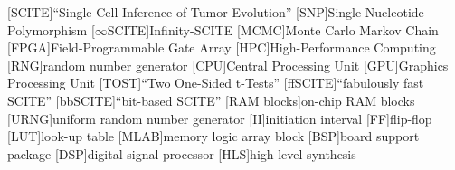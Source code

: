 [SCITE]{``Single Cell Inference of Tumor Evolution''}
[SNP]{Single-Nucleotide Polymorphism}
[$\infty$SCITE]{Infinity-SCITE}
[MCMC]{Monte Carlo Markov Chain}
[FPGA]{Field-Programmable Gate Array}
[HPC]{High-Performance Computing}
[RNG]{random number generator}
[CPU]{Central Processing Unit}
[GPU]{Graphics Processing Unit}
[TOST]{``Two One-Sided t-Tests''}
[ffSCITE]{``fabulously fast SCITE''}
[bbSCITE]{``bit-based SCITE''}
[RAM blocks]{on-chip RAM blocks}
[URNG]{uniform random number generator}
[II]{initiation interval}
[FF]{flip-flop}
[LUT]{look-up table}
[MLAB]{memory logic array block}
[BSP]{board support package}
[DSP]{digital signal processor}
[HLS]{high-level synthesis}
